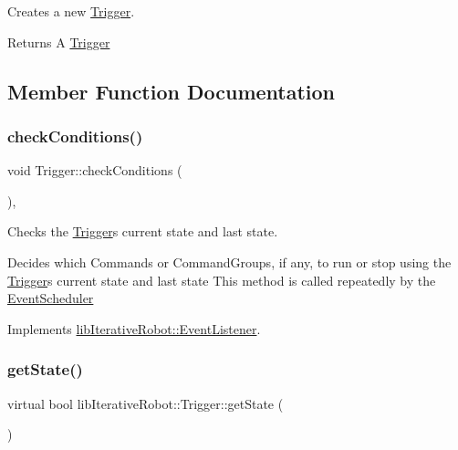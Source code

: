 Creates a new \mbox{\hyperlink{classlib_iterative_robot_1_1_trigger}{Trigger}}. 

\begin{DoxyReturn}{Returns}
A \mbox{\hyperlink{classlib_iterative_robot_1_1_trigger}{Trigger}} 
\end{DoxyReturn}


\subsection{Member Function Documentation}
\mbox{\label{classlib_iterative_robot_1_1_trigger_ac89c07cd514a1af516dd7f773cbedcab}} 
\subsubsection{\texorpdfstring{checkConditions()}{checkConditions()}}
{\footnotesize\ttfamily void Trigger\+::check\+Conditions (\begin{DoxyParamCaption}{ }\end{DoxyParamCaption})\hspace{0.3cm}{\ttfamily [protected]}, {\ttfamily [virtual]}}



Checks the \mbox{\hyperlink{classlib_iterative_robot_1_1_trigger}{Trigger}}\textquotesingle{}s current state and last state. 

Decides which Commands or Command\+Groups, if any, to run or stop using the \mbox{\hyperlink{classlib_iterative_robot_1_1_trigger}{Trigger}}\textquotesingle{}s current state and last state This method is called repeatedly by the \mbox{\hyperlink{classlib_iterative_robot_1_1_event_scheduler}{Event\+Scheduler}} 

Implements \mbox{\hyperlink{classlib_iterative_robot_1_1_event_listener_aacbdd1cd66bf22e081add72b127af3a1}{lib\+Iterative\+Robot\+::\+Event\+Listener}}.

\mbox{\label{classlib_iterative_robot_1_1_trigger_a785ea056a56974f2965c71fd0520bb87}} 
\subsubsection{\texorpdfstring{getState()}{getState()}}
{\footnotesize\ttfamily virtual bool lib\+Iterative\+Robot\+::\+Trigger\+::get\+State (\begin{DoxyParamCaption}{ }\end{DoxyParamCaption})\hspace{0.3cm}{\ttfamily [pure virtual]}}



